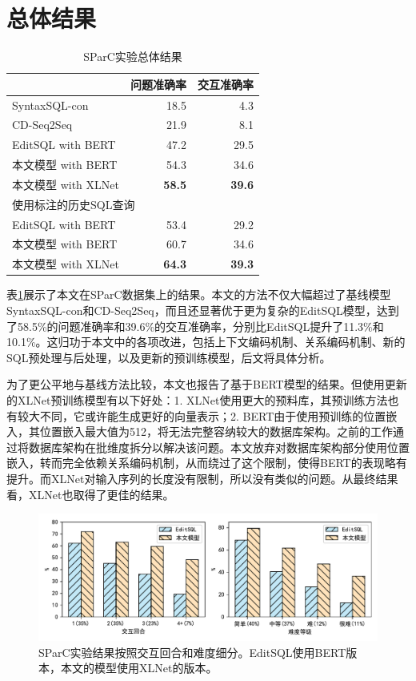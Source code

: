 \section{总体结果}

\begin{table}
    \centering
    \caption{SParC实验总体结果}
    \begin{tabular}{l|rr}
    \hline\hline
                        & 问题准确率 & 交互准确率 \\ \hline
    SyntaxSQL-con       & 18.5  & 4.3   \\
    CD-Seq2Seq          & 21.9  & 8.1   \\
    EditSQL with   BERT & 47.2  & 29.5  \\
    本文模型 with BERT      & 54.3  & 34.6  \\
    本文模型 with XLNet     & \textbf{58.5}  & \textbf{39.6}  \\ \hline
    \multicolumn{3}{l}{使用标注的历史SQL查询}    \\ \hline
    EditSQL with   BERT & 53.4  & 29.2  \\
    本文模型 with BERT      & 60.7  & 34.6  \\
    本文模型 with XLNet     & \textbf{64.3}  & \textbf{39.3}  \\ \hline\hline
    \end{tabular}
    \label{overall-results}
\end{table}

表\ref{overall-results}展示了本文在SParC数据集上的结果。本文的方法不仅大幅超过了基线模型SyntaxSQL-con和CD-Seq2Seq，而且还显著优于更为复杂的EditSQL模型，达到了58.5\%的问题准确率和39.6\%的交互准确率，分别比EditSQL提升了11.3\%和10.1\%。这归功于本文中的各项改进，包括上下文编码机制、关系编码机制、新的SQL预处理与后处理，以及更新的预训练模型，后文将具体分析。

为了更公平地与基线方法比较，本文也报告了基于BERT模型的结果。但使用更新的XLNet预训练模型有以下好处：1. XLNet使用更大的预料库，其预训练方法也有较大不同，它或许能生成更好的向量表示；2. BERT由于使用预训练的位置嵌入，其位置嵌入最大值为512，将无法完整容纳较大的数据库架构。之前的工作通过将数据库架构在批维度拆分以解决该问题。本文放弃对数据库架构部分使用位置嵌入，转而完全依赖关系编码机制，从而绕过了这个限制，使得BERT的表现略有提升。而XLNet对输入序列的长度没有限制，所以没有类似的问题。从最终结果看，XLNet也取得了更佳的结果。

\begin{figure}
    \centering
    \includegraphics[width=\linewidth]{figure/overall.pdf}
    \caption{SParC实验结果按照交互回合和难度细分。EditSQL使用BERT版本，本文的模型使用XLNet的版本。}
    \label{result-subdivide}
\end{figure}

